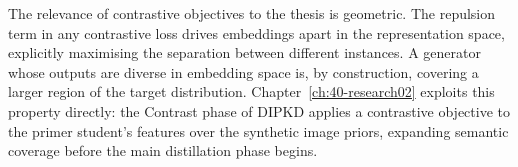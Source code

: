 \begin{foldable}
  The relevance of contrastive objectives to the thesis is geometric.
  The repulsion term in any contrastive loss drives embeddings apart in the representation space, explicitly maximising the separation between different instances.
  A generator whose outputs are diverse in embedding space is, by construction, covering a larger region of the target distribution.
  Chapter~\ref{ch:40-research02} exploits this property directly: the Contrast phase of DIPKD applies a contrastive objective to the primer student's features over the synthetic image priors, expanding semantic coverage before the main distillation phase begins.
\end{foldable}
